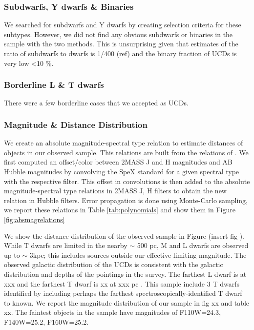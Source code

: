 \documentclass[manuscript]{aastex63}
\begin{document}
\subsubsection{ Subdwarfs, Y dwarfs  \& Binaries}

We searched for subdwarfs and Y dwarfs by creating selection criteria for these subtypes. However, we did not find any obvious subdwarfs or binaries in the sample with the two methods. This is unsurprising given that estimates of the ratio of subdwarfs to dwarfs is 1/400 (ref) and the binary fraction of UCDs is very low \textless 10 \%. 

\subsubsection{Borderline L \& T dwarfs }

There were a few borderline cases that we accepted as UCDs. 

\subsubsection{ Magnitude \& Distance  Distribution }

We create an absolute magnitude-spectral type relation to estimate distances of objects in our observed sample. This relations are built from the relations of \cite{2012ApJS..201...19D}. We first computed an offset/color between 2MASS J and H magnitudes and AB Hubble magnitudes by convolving the SpeX standard for a given spectral type with the respective filter. This offset {}in convolutions is then added to the absolute magnitude-spectral type relations in 2MASS J, H filters to obtain the new relation in Hubble filters. Error propagation is done using Monte-Carlo sampling, we report these relations in Table \ref{tab:polynomials} and show them in Figure \ref{fig:absmagrelations}

We show the distance distribution of the observed sample in Figure (insert fig ). While T dwarfs are limited in the nearby $\sim$ 500 pc, M and L dwarfs are observed up to $\sim$ 3kpc; this includes sources outside our effective limiting magnitude. The observed galactic distribution of the UCDs is consistent with the galactic distribution and depths of the pointings in the survey. The farthest L dwarf is at xxx and the farthest T dwarf is xx at xxx pc . This sample include 3 T dwarfs identified by \cite{2012ApJ...752L..14M} including perhaps the farthest spectroscopically-identified T dwarf to known. We report the magnitude distribution of our sample in fig xx and table xx.  The faintest objects in the sample have magnitudes of F110W=24.3, F140W=25.2, F160W=25.2. 
\end{document}
